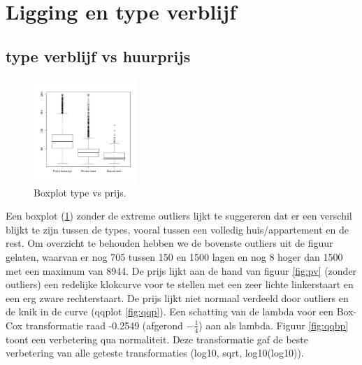 \documentclass[a4paper,kulak]{kulakarticle} %
\begin{document}
\section{Ligging en type verblijf}
\subsection{type verblijf vs huurprijs} \label{sec:pt}
\begin{figure}
	\begin{center}
		\includegraphics[width=0.35\textwidth]{boxplotPrijsCity.jpg}
	\end{center}
	\caption{Boxplot type vs prijs.}
	\label{fig:bpc}
\end{figure}
Een boxplot (\ref{fig:bpc}) zonder de extreme outliers lijkt te suggereren  dat er een verschil blijkt te zijn tussen de types, vooral tussen een volledig huis/appartement en de rest.
Om overzicht te behouden hebben we de bovenste outliers uit de figuur gelaten, waarvan er nog 705 tussen 150 en 1500 lagen en nog 8 hoger dan 1500 met een maximum van 8944. 
De prijs lijkt aan de hand van figuur \ref{fig:pv} (zonder outliers) een redelijke klokcurve voor te stellen met een zeer lichte linkerstaart en een erg zware rechterstaart. 
De prijs lijkt niet normaal verdeeld door outliers en de knik in de curve (qqplot \ref*{fig:qqp}). 
Een schatting van de lambda voor een Box-Cox transformatie raad -0.2549 (afgerond $-\frac{1}{4}$) aan als lambda.
Figuur \ref{fig:qqbp} toont een verbetering qua normaliteit.
Deze transformatie gaf de beste verbetering van alle geteste transformaties (log10, sqrt, log10(log10)).
\end{document}
